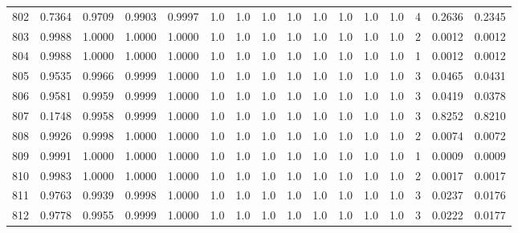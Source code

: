 \begin{tabular}{lrrrrrrrrrrrrrrr}
802 &      0.7364 &  0.9709 &  0.9903 &  0.9997 &     1.0 &     1.0 &     1.0 &     1.0 &     1.0 &     1.0 &      1.0 &        1.0 &      4 &                    0.2636 &                     0.2345 \\
803 &      0.9988 &  1.0000 &  1.0000 &  1.0000 &     1.0 &     1.0 &     1.0 &     1.0 &     1.0 &     1.0 &      1.0 &        1.0 &      2 &                    0.0012 &                     0.0012 \\
804 &      0.9988 &  1.0000 &  1.0000 &  1.0000 &     1.0 &     1.0 &     1.0 &     1.0 &     1.0 &     1.0 &      1.0 &        1.0 &      1 &                    0.0012 &                     0.0012 \\
805 &      0.9535 &  0.9966 &  0.9999 &  1.0000 &     1.0 &     1.0 &     1.0 &     1.0 &     1.0 &     1.0 &      1.0 &        1.0 &      3 &                    0.0465 &                     0.0431 \\
806 &      0.9581 &  0.9959 &  0.9999 &  1.0000 &     1.0 &     1.0 &     1.0 &     1.0 &     1.0 &     1.0 &      1.0 &        1.0 &      3 &                    0.0419 &                     0.0378 \\
807 &      0.1748 &  0.9958 &  0.9999 &  1.0000 &     1.0 &     1.0 &     1.0 &     1.0 &     1.0 &     1.0 &      1.0 &        1.0 &      3 &                    0.8252 &                     0.8210 \\
808 &      0.9926 &  0.9998 &  1.0000 &  1.0000 &     1.0 &     1.0 &     1.0 &     1.0 &     1.0 &     1.0 &      1.0 &        1.0 &      2 &                    0.0074 &                     0.0072 \\
809 &      0.9991 &  1.0000 &  1.0000 &  1.0000 &     1.0 &     1.0 &     1.0 &     1.0 &     1.0 &     1.0 &      1.0 &        1.0 &      1 &                    0.0009 &                     0.0009 \\
810 &      0.9983 &  1.0000 &  1.0000 &  1.0000 &     1.0 &     1.0 &     1.0 &     1.0 &     1.0 &     1.0 &      1.0 &        1.0 &      2 &                    0.0017 &                     0.0017 \\
811 &      0.9763 &  0.9939 &  0.9998 &  1.0000 &     1.0 &     1.0 &     1.0 &     1.0 &     1.0 &     1.0 &      1.0 &        1.0 &      3 &                    0.0237 &                     0.0176 \\
812 &      0.9778 &  0.9955 &  0.9999 &  1.0000 &     1.0 &     1.0 &     1.0 &     1.0 &     1.0 &     1.0 &      1.0 &        1.0 &      3 &                    0.0222 &                     0.0177 \\

\end{tabular}
